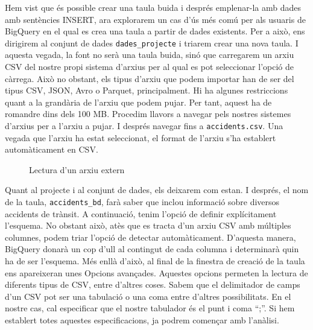 \documentclass[12pt,longbibliography]{article}
\theoremstyle{definition}
\theoremstyle{remark}
\begin{document}
Hem vist que és possible crear una taula buida i després emplenar-la amb dades amb sentències INSERT, ara explorarem un cas d'ús més comú per als usuaris de BigQuery en el qual es crea una taula a partir de dades existents. Per a això, ens dirigirem al conjunt de dades \verb|dades_projecte| i triarem crear una nova taula. I aquesta vegada, la font no serà una taula buida, sinó que carregarem un arxiu CSV del nostre propi sistema d'arxius per al qual es pot seleccionar l'opció de càrrega. Això no obstant, els tipus d’arxiu que podem importar han de ser del tipus CSV, JSON, Avro o Parquet, principalment. Hi ha algunes restriccions quant a la grandària de l'arxiu que podem pujar. Per tant, aquest ha de romandre dins dels 100 MB.  Procedim llavors a navegar pels nostres sistemes d'arxius per a l'arxiu a pujar. I després navegar fins a \verb|accidents.csv|. Una vegada que l'arxiu ha estat seleccionat, el format de l'arxiu s'ha establert automàticament en CSV. 

\vspace{2mm}
\begin{figure}[h!]
\par
{}%
\hfill
{}%
\par

\caption{Lectura d'un arxiu extern}
\label{fig:bq12}
\end{figure}
\vspace{2mm}

Quant al projecte i al conjunt de dades, els deixarem com estan. I després, el nom de la taula, \verb|accidents_bd|, farà saber que inclou informació sobre diversos accidents de trànsit. A continuació, tenim l'opció de definir explícitament l'esquema. No obstant això, atès que es tracta d'un arxiu CSV amb múltiples columnes, podem triar l'opció de detectar automàticament. D'aquesta manera, BigQuery donarà un cop d'ull al contingut de cada columna i determinarà quin ha de ser l'esquema. Més enllà d'això, al final de la finestra de creació de la taula ens apareixeran unes Opcions avançades. Aquestes opcions permeten la lectura de diferents tipus de CSV, entre d’altres coses. Sabem que el delimitador de camps d’un CSV pot ser una tabulació o una coma entre d’altres possibilitats. En el nostre cas, cal especificar que el nostre tabulador és el punt i coma “;”. Si hem establert totes aquestes especificacions, ja podrem començar amb l’anàlisi.
\end{document}
